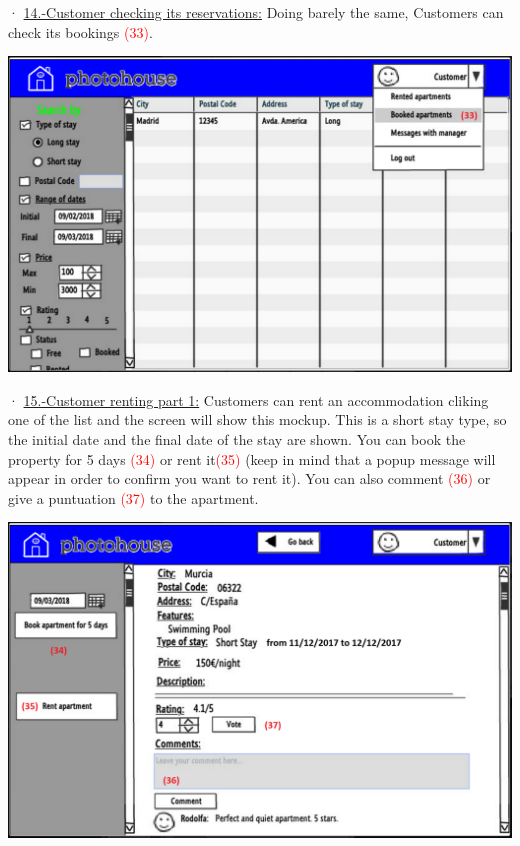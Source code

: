 \documentclass[12pt]{article}
\begin{document}
{\newpage
· \underline{14.-Customer checking its reservations:} Doing barely the same, Customers can check its bookings \textcolor{red}{(33)}.
\begin{center}
	\includegraphics[scale=.7]{customer_booked.PNG}
\end{center}


· \underline{15.-Customer renting part 1:} Customers can rent an accommodation cliking one of the list and the screen will show this mockup. This is a short stay type, so the initial date and the final date of the stay are shown. You can book the property for 5 days \textcolor{red}{(34)} or rent it\textcolor{red}{(35)} (keep in mind that a popup message will appear in order to confirm you want to rent it). You can also comment \textcolor{red}{(36)} or give a puntuation \textcolor{red}{(37)} to the apartment.
\begin{center}
	\includegraphics[scale=.7]{customer_renting_short.PNG}
\end{center}

}
\end{document}
